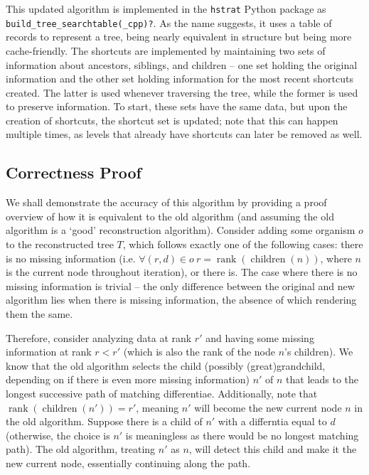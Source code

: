 This updated algorithm is implemented in the \texttt{hstrat} Python package \citep{moreno2024hstrat} as \texttt{build\_tree\_searchtable(\_cpp)?}. As the name suggests, it uses a table of records to represent a tree, being nearly equivalent in structure but being more cache-friendly. The shortcuts are implemented by maintaining two sets of information about ancestors, siblings, and children -- one set holding the original information and the other set holding information for the most recent shortcuts created. The latter is used whenever traversing the tree, while the former is used to preserve information. To start, these sets have the same data, but upon the creation of shortcuts, the shortcut set is updated; note that this can happen multiple times, as levels that already have shortcuts can later be removed as well.

\subsection{Correctness Proof}

We shall demonstrate the accuracy of this algorithm by providing a proof overview of how it is equivalent to the old algorithm (and assuming the old algorithm is a `good' reconstruction algorithm). Consider adding some organism $o$ to the reconstructed tree $T$, which follows exactly one of the following cases: there is no missing information (i.e. $\forall (r, d) \in o\ r = \operatorname{rank}(\operatorname{children}(n))$, where $n$ is the current node throughout iteration), or there is. The case where there is no missing information is trivial -- the only difference between the original and new algorithm lies when there is missing information, the absence of which rendering them the same. 

Therefore, consider analyzing data at rank $r'$ and having some missing information at rank $r < r'$ (which is also the rank of the node $n$'s children). We know that the old algorithm selects the child (possibly (great)grandchild, depending on if there is even more missing information) $n'$ of $n$ that leads to the longest successive path of matching differentiae. Additionally, note that $\operatorname{rank}(\operatorname{children}(n')) = r'$, meaning $n'$ will become the new current node $n$ in the old algorithm. Suppose there is a child of $n'$ with a differntia equal to $d$ (otherwise, the choice is $n'$ is meaningless as there would be no longest matching path). The old algorithm, treating $n'$ as $n$, will detect this child and make it the new current node, essentially continuing along the path. 

